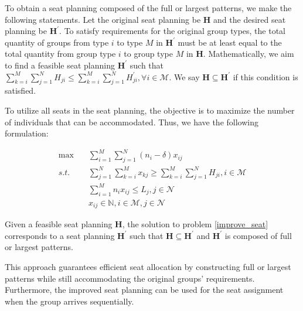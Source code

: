 To obtain a seat planning composed of the full or largest patterns, we make the following statements.
Let the original seat planning be $\bm{H}$ and the desired seat planning be $\bm{H}^{\prime}$. To satisfy requirements for the original group types, the total quantity of groups from type $i$ to type $M$ in $\bm{H}^{\prime}$ must be at least equal to the total quantity from group type $i$ to group type $M$ in $\bm{H}$. Mathematically, we aim to find a feasible seat planning $\bm{H}^{\prime}$ such that $\sum_{k=i}^{M} \sum_{j=1}^{N} H_{ji} \leq \sum_{k=i}^{M} \sum_{j=1}^{N} H^{'}_{ji}, \forall i \in \mathcal{M}$. We say $\bm{H} \subseteq \bm{H}^{'}$ if this condition is satisfied.

To utilize all seats in the seat planning, the objective is to maximize the number of individuals that can be accommodated. Thus, we have the following formulation:

\begin{equation}\label{improve_seat}
  \begin{aligned}
  \max \quad & \sum_{i=1}^{M} \sum_{j=1}^{N} (n_i-\delta)  x_{ij} \\
  s.t. \quad & \sum_{j=1}^{N} \sum_{k=i}^{M} x_{kj} \geq  \sum_{k=i}^{M} \sum_{j=1}^{N} H_{ji}, i \in \mathcal{M} \\
  & \sum_{i=1}^{M} n_{i} x_{ij} \leq L_{j}, j \in \mathcal{N} \\
  & x_{ij} \in \mathbb{N}, i \in \mathcal{M}, j \in \mathcal{N}
  \end{aligned}
\end{equation}

\begin{prop}\label{prop_construction}
Given a feasible seat planning $\bm{H}$, the solution to problem \eqref{improve_seat} corresponds to a seat planning $\bm{H}^{\prime}$ such that $\bm{H} \subseteq \bm{H}^{\prime}$ and $\bm{H}^{'}$ is composed of full or largest patterns.
\end{prop}


This approach guarantees efficient seat allocation by constructing full or largest patterns while still accommodating the original groups' requirements. Furthermore, the improved seat planning can be used for the seat assignment when the group arrives sequentially.


